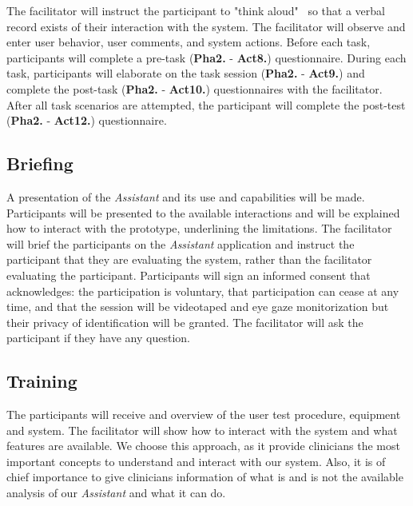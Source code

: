 The facilitator will instruct the participant to "think aloud"~\cite{bolle2016authors, kilsdonk2016uncovering} so that a verbal record exists of their interaction with the system. The facilitator will observe and enter user behavior, user comments, and system actions. Before each task, participants will complete a pre-task (\textbf{Pha2.} - \textbf{Act8.}) questionnaire. During each task, participants will elaborate on the task session (\textbf{Pha2.} - \textbf{Act9.}) and complete the post-task (\textbf{Pha2.} - \textbf{Act10.}) questionnaires with the facilitator. After all task scenarios are attempted, the participant will complete the post-test (\textbf{Pha2.} - \textbf{Act12.}) questionnaire.



\subsection{Briefing}

A presentation of the \textit{Assistant} and its use and capabilities will be made. Participants will be presented to the available interactions and will be explained how to interact with the prototype, underlining the limitations. The facilitator will brief the participants on the \textit{Assistant} application and instruct the participant that they are evaluating the system, rather than the facilitator evaluating the participant. Participants will sign an informed consent that acknowledges: the participation is voluntary, that participation can cease at any time, and that the session will be videotaped and eye gaze monitorization but their privacy of identification will be granted. The facilitator will ask the participant if they have any question.



\subsection{Training}

The participants will receive and overview of the user test procedure, equipment and system. The facilitator will show how to interact with the system and what features are available. We choose this approach, as it provide clinicians the most important concepts to understand and interact with our system. Also, it is of chief importance to give clinicians information of what is and is not the available analysis of our \textit{Assistant} and what it can do.


\clearpage